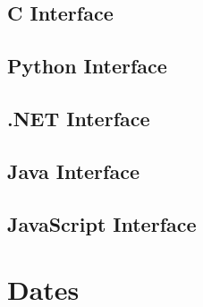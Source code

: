 \documentclass{book}
\begin{document}
\begin{cpdflib}
\clearpage
\section*{C Interface}
\begin{small}\tt

\end{small}
\end{cpdflib}

\begin{pycpdflib}
\clearpage
\section*{Python Interface}
\begin{small}\tt

\end{small}
\end{pycpdflib}

\begin{dotnetcpdflib}
\clearpage
\section*{.NET Interface}
\begin{small}\tt

\end{small}
\end{dotnetcpdflib}

\begin{jcpdflib}
\clearpage
\section*{Java Interface}
\begin{small}\tt

\end{small}
\end{jcpdflib}

\begin{jscpdflib}
\clearpage
\section*{JavaScript Interface}
\begin{small}\tt

\end{small}
\end{jscpdflib}

\appendix
\chapter{Dates}\pagestyle{empty}
\label{dates}
\end{document}
